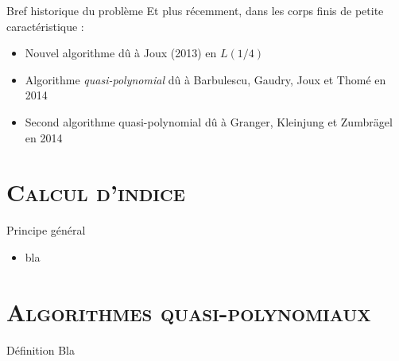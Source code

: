 \documentclass[xcolor=x11names,compress]{beamer}
\theoremstyle{break}
\theoremstyle{sc}
\theoremstyle{definition}
\theoremstyle{remark}
\begin{document}
\begin{frame}{Bref historique du problème}
  Et plus récemment, dans les corps finis de petite caractéristique :
  \begin{itemize}
    \item Nouvel algorithme dû à Joux (2013) en $L(1/4)$
    \item Algorithme \emph{quasi-polynomial} dû à Barbulescu, Gaudry, Joux et
      Thomé en 2014
    \item Second algorithme quasi-polynomial dû à Granger, Kleinjung et
      Zumbrägel en 2014
  \end{itemize}
\end{frame}

\section{\scshape Calcul d'indice}
\begin{frame}{Principe général}
  \begin{itemize}
    \item bla
  \end{itemize}
\end{frame}

\section{\scshape Algorithmes quasi-polynomiaux}
\begin{frame}{Définition}
 Bla 
\end{frame}
\end{document}
